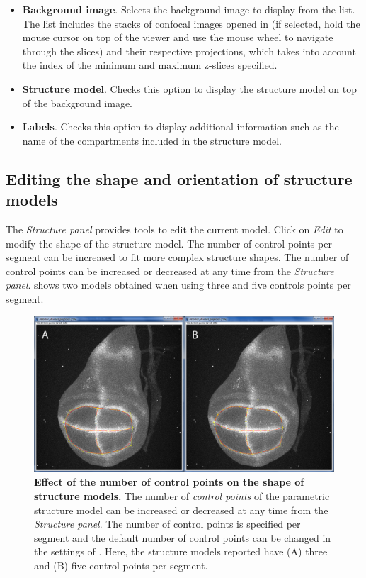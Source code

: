 \begin{itemize}
 \item \textbf{Background image}. Selects the background image to display from the list. The list includes the stacks of confocal images opened in \wingj (if selected, hold the mouse cursor on top of the viewer and use the mouse wheel to navigate through the slices) and their respective projections, which takes into account the index of the minimum and maximum z-slices specified.
 \item \textbf{Structure model}. Checks this option to display the structure model on top of the background image.
 \item \textbf{Labels}. Checks this option to display additional information such as the name of the compartments included in the structure model.
\end{itemize}

\subsection{Editing the shape and orientation of structure models}\label{sec:wingj_structure_edit}
The \emph{Structure panel} provides tools to edit the current model. Click on \textit{Edit} to modify the shape of the structure model. The number of control points per segment can be increased to fit more complex structure shapes. The number of control points can be increased or decreased at any time from the \emph{Structure panel}.  shows two models obtained when using three and five controls points per segment.


\begin{figure}[!h]
\centering
\includegraphics[scale=0.26]{images/wingj_structure_control_points.jpg}
\caption{\textbf{Effect of the number of control points on the shape of structure models.} The number of \textit{control points} of the parametric structure model can be increased or decreased at any time from the \textit{Structure panel}. The number of control points is specified per segment and the default number of control points can be changed in the settings of \wingj. Here, the structure models reported have (A) three and (B) five control points per segment.}
\label{fig:wingj_structure_control_points}
\end{figure}

